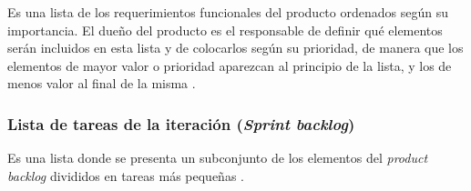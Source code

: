 Es una lista de los requerimientos funcionales del producto ordenados según su importancia. El dueño del producto es el responsable de definir qué elementos serán incluidos en esta lista y de colocarlos según su prioridad, de manera que los elementos de mayor valor o prioridad aparezcan al principio de la lista, y los de menos valor al final de la misma \cite{SCRM2}. 

\subsubsection{Lista de tareas de la iteración (\textit{Sprint backlog})}

Es una lista donde se presenta un subconjunto de los elementos del \textit{product backlog} divididos en tareas más pequeñas \cite{SCRM2}. 


